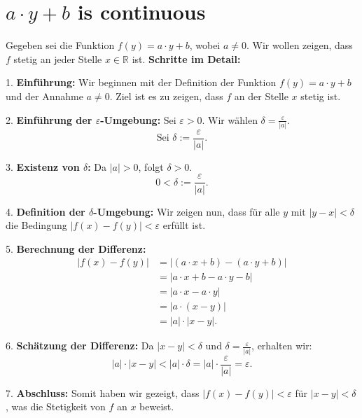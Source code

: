 \section{$a \cdot y + b$ is continuous}

Gegeben sei die Funktion $f(y) = a \cdot y + b$, wobei $a \neq 0$. Wir wollen zeigen, dass $f$ stetig an jeder Stelle $x \in \mathbb{R}$ ist.
\textbf{Schritte im Detail:}

1. \textbf{Einführung:}
   Wir beginnen mit der Definition der Funktion $f(y) = a \cdot y + b$ und der Annahme $a \neq 0$. Ziel ist es zu zeigen, dass $f$ an der Stelle $x$ stetig ist. 

2. \textbf{Einführung der $\varepsilon$-Umgebung:}
   Sei $\varepsilon > 0$. Wir wählen $\delta = \frac{\varepsilon}{|a|}$.
   \[
   \text{Sei } \delta := \frac{\varepsilon}{|a|}.
   \]

3. \textbf{Existenz von $\delta$:}
   Da $|a| > 0$, folgt $\delta > 0$.
   \[
   0 < \delta := \frac{\varepsilon}{|a|}.
   \]

4. \textbf{Definition der $\delta$-Umgebung:}
   Wir zeigen nun, dass für alle $y$ mit $|y - x| < \delta$ die Bedingung $|f(x) - f(y)| < \varepsilon$ erfüllt ist. 

5. \textbf{Berechnung der Differenz:}
   \begin{align*}
   |f(x) - f(y)| &= |(a \cdot x + b) - (a \cdot y + b)| \\
   &= |a \cdot x + b - a \cdot y - b| \\
   &= |a \cdot x - a \cdot y| \\
   &= |a \cdot (x - y)| \\
   &= |a| \cdot |x - y|.
   \end{align*}

6. \textbf{Schätzung der Differenz:}
   Da $|x - y| < \delta$ und $\delta = \frac{\varepsilon}{|a|}$, erhalten wir:
   \[
   |a| \cdot |x - y| < |a| \cdot \delta = |a| \cdot \frac{\varepsilon}{|a|} = \varepsilon.
   \]

7. \textbf{Abschluss:}
   Somit haben wir gezeigt, dass $|f(x) - f(y)| < \varepsilon$ für $|x - y| < \delta$, was die Stetigkeit von $f$ an $x$ beweist.
